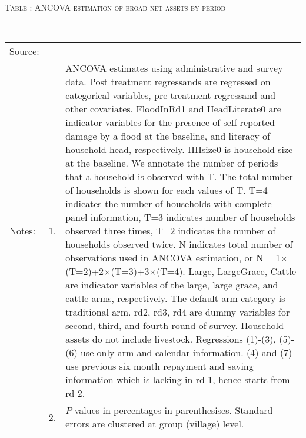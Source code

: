 \hspace{-1cm}\begin{minipage}[t]{14cm}
\hfil\textsc{\normalsize Table \thetable: ANCOVA estimation of broad net assets by period\label{tab ANCOVA net assets timevarying}}\\
\setlength{\tabcolsep}{1pt}
\setlength{\baselineskip}{8pt}
\renewcommand{\arraystretch}{.55}
\hfil{}\\
\renewcommand{\arraystretch}{.8}
\setlength{\tabcolsep}{1pt}
\begin{tabular}{>{\hfill\scriptsize}p{1cm}<{}>{\hfill\scriptsize}p{.25cm}<{}>{\scriptsize}p{12cm}<{\hfill}}
Source:& \multicolumn{2}{l}{\scriptsize Estimated with GUK administrative and survey data.}\\
Notes: & 1. & ANCOVA estimates using administrative and survey data. Post treatment regressands are regressed on categorical variables, pre-treatment regressand and other covariates. \textsf{FloodInRd1} and \textsf{HeadLiterate0} are indicator variables for the presence of self reported damage by a flood at the baseline, and literacy of household head, respectively. \textsf{HHsize0} is household size at the baseline. We annotate the number of periods that a household is observed with \textsf{T}. The total number of households is shown for each values of \textsf{T}. \textsf{T=4} indicates the number of households with complete panel information, \textsf{T=3} indicates number of households observed three times, \textsf{T=2} indicates the number of households observed twice. \textsf{N} indicates total number of observations used in ANCOVA estimation, or \textsf{N$=$1$\times$(T=2)+2$\times$(T=3)+3$\times$(T=4)}.  \textsf{Large}, \textsf{LargeGrace}, \textsf{Cattle} are indicator variables of the \textsf{large}, \textsf{large grace}, and \textsf{cattle} arms, respectively. The default arm category is \textsf{traditional} arm. \textsf{rd2, rd3, rd4} are dummy variables for second, third, and fourth round of survey.  Household assets do not include livestock. Regressions (1)-(3), (5)-(6) use only arm and calendar information. (4) and (7) use previous six month repayment and saving information which is lacking in rd 1, hence starts from rd 2.\\
& 2. & $P$ values in percentages in parenthesises. Standard errors are clustered at group (village) level.
\end{tabular}
\end{minipage}

